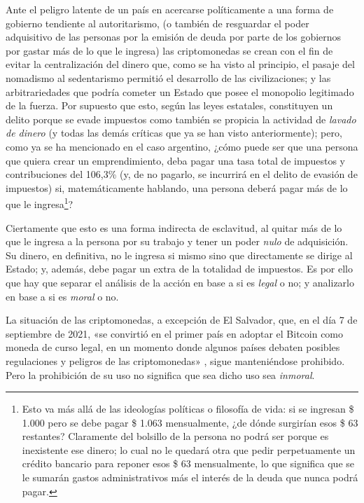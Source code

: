 \documentclass[12pt,a4paper,twoside]{book}
\begin{document}
Ante el peligro latente de un país en acercarse políticamente a una forma de gobierno tendiente al autoritarismo, (o también de resguardar el poder adquisitivo de las personas por la emisión de deuda por parte de los gobiernos por gastar más de lo que le ingresa) las criptomonedas se crean con el fin de evitar la centralización del dinero que, como se ha visto al principio, el pasaje del nomadismo al sedentarismo permitió el desarrollo de las civilizaciones; y las arbitrariedades que podría cometer un Estado que posee el monopolio legitimado de la fuerza. Por supuesto que esto, según las leyes estatales, constituyen un delito porque se evade impuestos como también se propicia la actividad de \textit{lavado de dinero} (y todas las demás críticas que ya se han visto anteriormente); pero, como ya se ha mencionado en el caso argentino, ¿cómo puede ser que una persona que quiera crear un emprendimiento, deba pagar una tasa total de impuestos y contribuciones del 106,3\% (y, de no pagarlo, se incurrirá en el delito de evasión de impuestos) si, matemáticamente hablando, una persona deberá pagar más de lo que le ingresa\footnote{Esto va más allá de las ideologías políticas o filosofía de vida: si se ingresan \$ 1.000 pero se debe pagar \$ 1.063 mensualmente, ¿de dónde surgirían esos \$ 63 restantes? Claramente del bolsillo de la persona no podrá ser porque es inexistente ese dinero; lo cual no le quedará otra que pedir perpetuamente un crédito bancario para reponer esos \$ 63 mensualmente, lo que significa que se le sumarán gastos administrativos más el interés de la deuda que nunca podrá pagar.}?

Ciertamente que esto es una forma indirecta de esclavitud, al quitar más de lo que le ingresa a la persona por su trabajo y tener un poder \textit{nulo} de adquisición. Su dinero, en definitiva, no le ingresa si mismo sino que directamente se dirige al Estado; y, además, debe pagar un extra de la totalidad de impuestos. Es por ello que hay que separar el análisis de la acción en base a si es \textit{legal} o no; y analizarlo en base a si es \textit{moral} o no.

La situación de las criptomonedas, a excepción de El Salvador, que, en el día 7 de septiembre de 2021, «se convirtió en el primer país en adoptar el Bitcoin como moneda de curso legal, en un momento donde algunos países debaten posibles regulaciones y peligros de las criptomonedas» \cite{bitcoin:elsalvador}, sigue manteniéndose prohibido. Pero la prohibición de su uso no significa que sea dicho uso sea \textit{inmoral}. 
\end{document}
